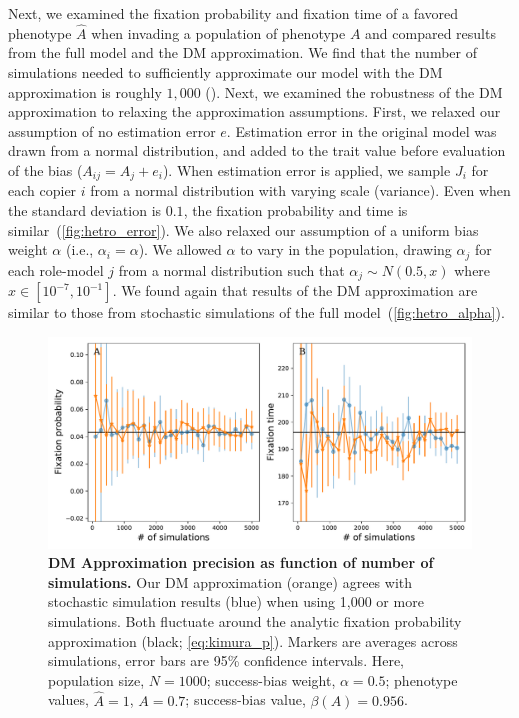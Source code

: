 \documentclass[12pt]{extarticle}
\begin{document}
Next, we examined the fixation probability and fixation time of a favored phenotype $\hat{A}$ when invading a population of phenotype $A$ and compared results from the full model and the DM approximation.
We find that the number of simulations needed to sufficiently approximate our model with the DM approximation is roughly $1,000$ ().
Next, we examined the robustness of the DM approximation to relaxing the approximation assumptions.
First, we relaxed our assumption of no estimation error $e$.
Estimation error in the original model was drawn from a normal distribution, and added to the trait value before evaluation of the bias ($A_{ij} = A_j + e_i$).
When estimation error is applied, we sample $J_i$ for each copier $i$ from a normal distribution with varying scale (variance).
Even when the standard deviation is $0.1$, the fixation probability and time is similar~(\cref{fig:hetro_error}). 
We also relaxed our assumption of a uniform bias weight $\alpha$ (i.e., $\alpha_i=\alpha$). We allowed $\alpha$ to vary in the population, drawing $\alpha_j$ for each role-model $j$ from a normal distribution such that $\alpha_j \sim N(0.5,x)$ where $x \in [10^{-7},10^{-1}]$. 
We found again that results of the DM approximation are similar to those from stochastic simulations of the full model~(\cref{fig:hetro_alpha}).



\begin{figure}[h]
    \includegraphics[width=\linewidth]{../figures/final/num_sims.pdf}
  \caption{
  \textbf{DM Approximation precision as function of number of simulations.}
  Our DM approximation (orange) agrees with stochastic simulation results (blue) when using 1,000 or more simulations.
  Both fluctuate around the analytic fixation probability approximation (black; \cref{eq:kimura_p}).
  Markers are averages across simulations, error bars are 95\% confidence intervals.
  Here, population size, $N=1000$; success-bias weight, $\alpha=0.5$; phenotype values, $\hat{A}=1$, $A=0.7$; success-bias value, $\beta(A)=0.956$.}	
  \label{fig:num_sims}
\end{figure}
\end{document}
